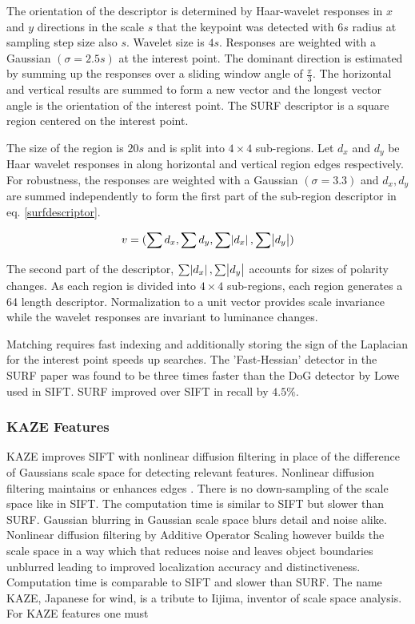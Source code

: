 \documentclass[english,12pt,a4paper,pdftex,elec,utf8]{aaltothesis}
\begin{document}
The orientation of the descriptor is determined by Haar-wavelet responses in $x$ and $y$ directions in the scale $s$ that the keypoint was detected with $6s$ radius at sampling step size also $s$. Wavelet size is $4s$. Responses are weighted with a Gaussian $(\sigma = 2.5s)$ at the interest point. The dominant direction is estimated by summing up the responses over a sliding window angle of $\frac{\pi}{3}$. The horizontal and vertical results are summed to form a new vector and the longest vector angle is the orientation of the interest point. The SURF descriptor is a square region centered on the interest point. \cite{Bay2006}

The size of the region is $20s$ and is split into $4 \times 4$ sub-regions. Let $d_x$ and $d_y$ be Haar wavelet responses in along horizontal and vertical region edges respectively. For robustness, the responses are weighted with a Gaussian $(\sigma = 3.3)$ and $d_x, d_y$ are summed independently to form the first part of the sub-region descriptor in eq. \ref{surfdescriptor}. \cite{Bay2006}

\begin{equation}
  \label{surfdescriptor}
v = (\sum d_x, \sum d_y, \sum \abs{d_x}, \sum \abs{d_y})
  \end{equation}

The second part of the descriptor, $\sum \abs{d_x}, \sum \abs{d_y}$ accounts for sizes of polarity changes. As each region is divided into $4 \times 4$ sub-regions, each region generates a 64 length descriptor. Normalization to a unit vector provides scale invariance while the wavelet responses are invariant to luminance changes. \cite{Bay2006}

Matching requires fast indexing and additionally storing the sign of the Laplacian for the interest point speeds up searches. The 'Fast-Hessian' detector in the SURF paper was found to be three times faster than the DoG detector by Lowe used in SIFT. SURF improved over SIFT in recall by $4.5\%$. \cite{Bay2006}

\subsubsection{KAZE Features}
KAZE improves SIFT with nonlinear diffusion filtering in place of the difference of Gaussians scale space for detecting relevant features. Nonlinear diffusion filtering maintains or enhances edges \cite{Weickert1998}. There is no down-sampling of the scale space like in SIFT. The computation time is similar to SIFT but slower than SURF. Gaussian blurring in Gaussian scale space blurs detail and noise alike. Nonlinear diffusion filtering by Additive Operator Scaling however builds the scale space in a way which that reduces noise and leaves object boundaries unblurred leading to improved localization accuracy and distinctiveness. Computation time is comparable to SIFT and slower than SURF. The name KAZE, Japanese for wind, is a tribute to Iijima, inventor of scale space analysis. For KAZE features one must
\end{document}

